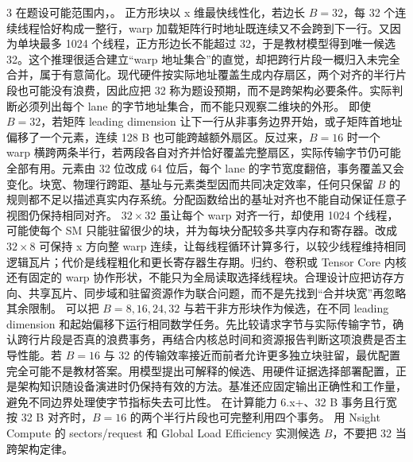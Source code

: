 \begin{solutionexercise}{3}
\conclusionheading 在题设可能范围内，。
\discussionheading
{}
正方形块以 x 维最快线性化，若边长 $B=32$，每 32 个连续线程恰好构成一整行，warp 加载矩阵行时地址既连续又不会跨到下一行。又因为单块最多 1024 个线程，正方形边长不能超过 32，于是教材模型得到唯一候选 32。这个推理很适合建立“warp 地址集合”的直觉，却把跨行片段一概归入未完全合并，属于有意简化。现代硬件按实际地址覆盖生成内存扇区，两个对齐的半行片段也可能没有浪费，因此应把 32 称为题设预期，而不是跨架构必要条件。实际判断必须列出每个 lane 的字节地址集合，而不能只观察二维块的外形。
即使 $B=32$，若矩阵 leading dimension 让下一行从非事务边界开始，或子矩阵首地址偏移了一个元素，连续 128 B 也可能跨越额外扇区。反过来，$B=16$ 时一个 warp 横跨两条半行，若两段各自对齐并恰好覆盖完整扇区，实际传输字节仍可能全部有用。元素由 32 位改成 64 位后，每个 lane 的字节宽度翻倍，事务覆盖又会变化。块宽、物理行跨距、基址与元素类型因而共同决定效率，任何只保留 $B$ 的规则都不足以描述真实内存系统。分配函数给出的基址对齐也不能自动保证任意子视图仍保持相同对齐。
$32\times32$ 虽让每个 warp 对齐一行，却使用 1024 个线程，可能使每个 SM 只能驻留很少的块，并为每块分配较多共享内存和寄存器。改成 $32\times8$ 可保持 x 方向整 warp 连续，让每线程循环计算多行，以较少线程维持相同逻辑瓦片；代价是线程粗化和更长寄存器生存期。归约、卷积或 Tensor Core 内核还有固定的 warp 协作形状，不能只为全局读取选择线程块。合理设计应把访存方向、共享瓦片、同步域和驻留资源作为联合问题，而不是先找到“合并块宽”再忽略其余限制。
可以把 $B=8,16,24,32$ 与若干非方形块作为候选，在不同 leading dimension 和起始偏移下运行相同数学任务。先比较请求字节与实际传输字节，确认跨行片段是否真的浪费事务，再结合内核总时间和资源报告判断这项浪费是否主导性能。若 $B=16$ 与 32 的传输效率接近而前者允许更多独立块驻留，最优配置完全可能不是教材答案。用模型提出可解释的候选、用硬件证据选择部署配置，正是架构知识随设备演进时仍保持有效的方法。基准还应固定输出正确性和工作量，避免不同边界处理使字节指标失去可比性。
\variantheading 在计算能力 6.x+、32 B 事务且行宽按 32 B 对齐时，$B=16$ 的两个半行片段也可完整利用四个事务。
\practiceheading 用 Nsight Compute 的 sectors/request 和 Global Load Efficiency 实测候选 $B$，不要把 32 当跨架构定律。
\end{solutionexercise}

